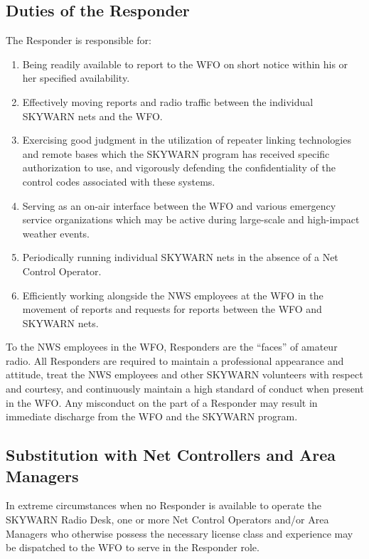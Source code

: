 \documentclass[pdflatex,letterpaper,twoside,12pt]{book}
\begin{document}
\subsection{Duties of the Responder}

The Responder is responsible for:

\begin{enumerate}
\item Being readily available to report to the WFO on short notice within his or her specified availability.
\item Effectively moving reports and radio traffic between the individual SKYWARN nets and the WFO.
\item Exercising good judgment in the utilization of repeater linking technologies and remote bases which the SKYWARN program has received specific authorization to use, and vigorously defending the confidentiality of the control codes associated with these systems.
\item Serving as an on-air interface between the WFO and various emergency service organizations which may be active during large-scale and high-impact weather events.
\item Periodically running individual SKYWARN nets in the absence of a Net Control Operator.
\item Efficiently working alongside the NWS employees at the WFO in the movement of reports and requests for reports between the WFO and SKYWARN nets.
\end{enumerate}

To the NWS employees in the WFO, Responders are the ``faces'' of amateur radio.  All Responders are required to maintain a professional appearance and attitude, treat the NWS employees and other SKYWARN volunteers with respect and courtesy, and continuously maintain a high standard of conduct when present in the WFO. Any misconduct on the part of a Responder may result in immediate discharge from the WFO and the SKYWARN program.

\subsection{Substitution with Net Controllers and Area Managers}

In extreme circumstances when no Responder is available to operate the SKYWARN Radio Desk, one or more Net Control Operators and/or Area Managers who otherwise possess the necessary license class and experience may be dispatched to the WFO to serve in the Responder role.
\end{document}
